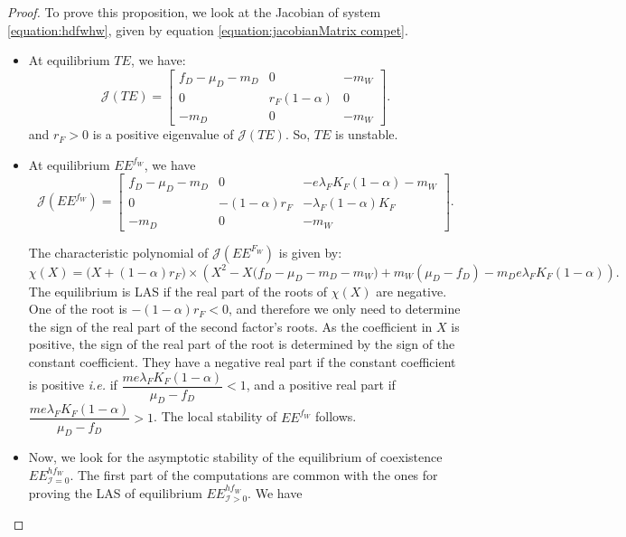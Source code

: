 \documentclass{article}
\newcommand{\lfw}{\lambda_{F}}
\newcommand{\lfw}{\lambda_{F}}
\newcommand{\cI}{\mathcal{I}}
\theoremstyle{definition}
\theoremstyle{remark}
\begin{document}
\begin{proof}
To prove this proposition, we look at the Jacobian of system \eqref{equation:hdfwhw}, given by equation \eqref{equation:jacobianMatrix compet}.


\begin{itemize}
\item At equilibrium $TE$, we have:
\begin{equation*}
\mathcal{J}(TE) = \begin{bmatrix}
f_D-\mu_D - m_D & 0 &  -m_W \\
0 & r_F(1-\alpha)  &  0\\
-m_D & 0 & -m_W
\end{bmatrix}.
\end{equation*}
and $r_F > 0$ is a positive eigenvalue of $\mathcal{J}(TE)$. So, $TE$ is unstable.
\item At equilibrium $EE^{f_W}$, we have
\begin{equation*}
\mathcal{J}(EE^{f_W}) = \begin{bmatrix}
f_D-\mu_D - m_D & 0 & -e\lfw K_F(1-\alpha) - m_W \\
0 & -(1-\alpha)r_F  & -\lfw(1-\alpha)K_F  \\
-m_D & 0 & -m_W
\end{bmatrix}.
\end{equation*}

The characteristic polynomial of $\mathcal{J}(EE^{F_W})$ is given by:
\begin{equation*}
\chi(X) = \big(X +(1-\alpha)r_F\big) \times \left(X^2 - X\Big(f_D - \mu_D - m_D - m_W \Big) + m_W(\mu_D - f_D) - m_D e \lfw K_F(1-\alpha) \right).
\end{equation*}
The equilibrium is LAS if the real part of the roots of $\chi(X)$ are negative. One of the root is $-(1-\alpha)r_F < 0$, and therefore we only need to determine the sign of the real part of the second factor's roots. As the coefficient in $X$ is positive, the sign of the real part of the root is determined by the sign of the constant coefficient.
They have a negative real part if the constant coefficient is positive \textit{i.e.} if $\dfrac{m e \lfw K_F(1-\alpha)}{\mu_D - f_D} < 1 $, and a positive real part if $\dfrac{m e \lfw K_F(1-\alpha)}{\mu_D - f_D} > 1 $. The local stability of $EE^{f_W}$ follows.

\item Now, we look for the asymptotic stability of the equilibrium of coexistence $EE^{hf_W}_{\cI=0}$. The first part of the computations are common with the ones for proving the LAS of equilibrium $EE^{hf_W}_{\cI >0}$.
We have



\end{itemize}
\end{proof}
\end{document}
